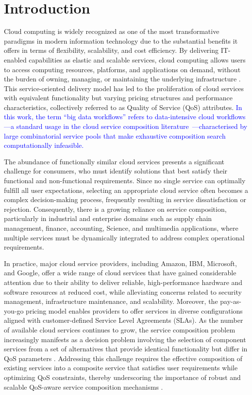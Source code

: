 \documentclass[3p,twocolumn]{elsarticle}
\theoremstyle{thmstyleone}%
\theoremstyle{thmstyletwo}%
\theoremstyle{thmstylethree}%
\begin{document}
 \section{Introduction}
 \label{s1}

Cloud computing is widely recognized as one of the most transformative paradigms in modern information technology due to the substantial benefits it offers in terms of flexibility, scalability, and cost efficiency. By delivering IT-enabled capabilities as elastic and scalable services, cloud computing allows users to access computing resources, platforms, and applications on demand, without the burden of owning, managing, or maintaining the underlying infrastructure 
\cite{Zheng2017qos}. This service-oriented delivery model has led to the proliferation of cloud services with equivalent functionality but varying pricing structures and performance characteristics, collectively referred to as Quality of Service (QoS) attributes. \textcolor{blue}{In this work, the term ``big data workflows'' refers to data-intensive cloud workflows---a standard usage in the cloud service composition literature~\cite{jula2014cloud}---characterised by large combinatorial service pools that make exhaustive composition search computationally infeasible.}

The abundance of functionally similar cloud services presents a significant challenge for consumers, who must identify solutions that best satisfy their functional and non-functional requirements. Since no single service can optimally fulfill all user expectations, selecting an appropriate cloud service often becomes a complex decision-making process, frequently resulting in service dissatisfaction or rejection. Consequently, there is a growing reliance on service composition, particularly in industrial and enterprise domains such as supply chain management, finance, accounting, Science, and multimedia applications, where multiple services must be dynamically integrated to address complex operational requirements.


In practice, major cloud service providers, including Amazon, IBM, Microsoft, and Google, offer a wide range of cloud services that have gained considerable attention due to their ability to deliver reliable, high-performance hardware and software resources at reduced cost, while alleviating concerns related to security management, infrastructure maintenance, and scalability. Moreover, the pay-as-you-go pricing model enables providers to offer services in diverse configurations aligned with customer-defined Service Level Agreements (SLAs).
As the number of available cloud services continues to grow, the service composition problem increasingly manifests as a decision problem involving the selection of component services from a set of alternatives that provide identical functionality but differ in QoS parameters \cite{alrifai2008scalable}. Addressing this challenge requires the effective composition of existing services into a composite service that satisfies user requirements while optimizing QoS constraints, thereby underscoring the importance of robust and scalable QoS-aware service composition mechanisms \cite{eisa2020modelling}. 
\end{document}
